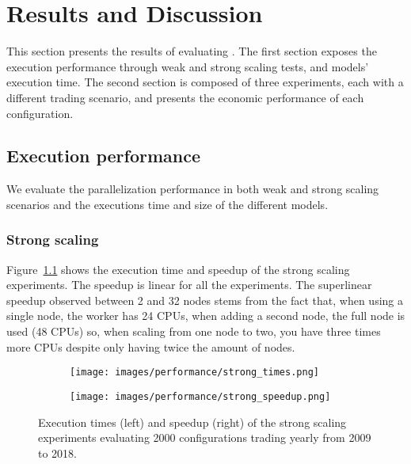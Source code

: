 \chapter{Results and Discussion}
\label{chap:results} 

This section presents the results of evaluating \HPCsys. The first section exposes the execution performance through weak and strong scaling tests, and models' execution time. The second section is composed of three experiments, each with a different trading scenario, and presents the economic performance of each configuration.

\section{Execution performance}

We evaluate the parallelization performance in both weak and strong scaling scenarios and the executions time and size of the different models.

\subsection{Strong scaling}

Figure~\ref{fig:strong} shows the execution time and speedup of the strong scaling experiments. The speedup is linear for all the experiments. The superlinear speedup observed between 2 and 32 nodes stems from the fact that, when using a single node, the worker has 24 CPUs, when adding a second node, the full node is used (48 CPUs) so, when scaling from one node to two, you have three times more CPUs despite only having twice the amount of nodes. 

\begin{figure}
\centering
\begin{subfigure}{.5\textwidth}
  \centering
  \texttt{[image: images/performance/strong\_times.png]}
\end{subfigure}%
\begin{subfigure}{.5\textwidth}
  \centering
  \texttt{[image: images/performance/strong\_speedup.png]}
\end{subfigure}
\caption{Execution times (left) and speedup (right) of the strong scaling experiments evaluating 2000 configurations trading yearly from 2009 to 2018.}
\label{fig:strong}
\end{figure}

